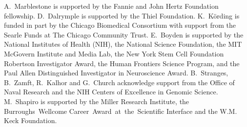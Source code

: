 A.~Marblestone is supported by the Fannie and John Hertz Foundation fellowship.
D.~Dalrymple is supported by the Thiel Foundation.
K.~K\"ording is funded in part by the Chicago Biomedical Consortium with support from the Searle Funds at The Chicago Community Trust.
E.~Boyden is supported by the National Institutes of Health (NIH), the National Science Foundation, the MIT
McGovern Institute and Media Lab, the New York Stem Cell Foundation Robertson Investigator
Award, the Human Frontiers Science Program, and the Paul Allen Distinguished Investigator in
Neuroscience Award.
B.~Stranges, B.~Zamft, R.~Kalhor and G.~Church acknowledge support from the Office of Naval Research and the NIH Centers of Excellence in Genomic Science.
M.~Shapiro is supported by the Miller Research Institute, the Burroughs~Wellcome Career~Award~at~the~Scientific Interface and the W.M. Keck Foundation.

\printbibliography[notsubtype=hide]



